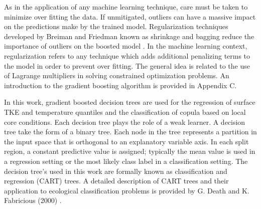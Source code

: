 As in the application of any machine learning technique, care must be taken to minimize over fitting the data.  If unmitigated, outliers can have a massive impact on the predictions make by the trained model.  Regularization techniques developed by Breiman and Friedman known as shrinkage and bagging reduce the importance of outliers on the boosted model \cite{breiman1996}.  In the machine learning context, regularization refers to any technique which adds additional penalizing terms to the model in order to prevent over fitting.  The general idea is related to the use of Lagrange multipliers in solving constrained optimization problems.  An introduction to the gradient boosting algorithm is provided in Appendix C.

In this work, gradient boosted decision trees are used for the regression of surface TKE and temperature quantiles and the classification of copula based on local core conditions.   Each decision tree plays the role of a weak learner.  A decision tree take the form of a binary tree.  Each node in the tree represents a partition in the input space that is orthogonal to an explanatory variable axis.  In each split region, a constant predictive value is assigned; typically the mean value is used in a regression setting or the most likely class label in a classification setting.  The decision tree's used in this work are formally known as classification and regression (CART) trees.  A detailed description of CART trees and their application to ecological classification problems is provided by G. Death and K. Fabricious (2000) \cite{death2000}. 


